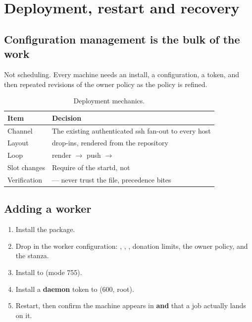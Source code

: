 \chapter{Deployment, restart and recovery}
\label{ch:deploy}

\section{Configuration management is the bulk of the work}

Not scheduling. Every machine needs an install, a configuration, a token, and
then repeated revisions of the owner policy as the policy is refined.

\begin{table}[H]
\centering
\begin{tabularx}{\textwidth}{L{0.20\textwidth} Y}
\toprule
\textbf{Item} & \textbf{Decision} \\
\midrule
Channel & The existing authenticated ssh fan-out to every host \\
Layout &  drop-ins, rendered from the repository \\
Loop & render $\rightarrow$ push $\rightarrow$  \\
Slot changes & Require  of the startd, not  \\
Verification &  --- never trust the file,  precedence bites \\
\bottomrule
\end{tabularx}
\caption{Deployment mechanics.}
\end{table}

\section{Adding a worker}

\begin{enumerate}
  \item Install the package.
  \item Drop in the worker configuration: ,
        , , donation limits, the owner
        policy, and the  stanza.
  \item Install  to  (mode 755).
  \item Install a \textbf{daemon} token to  (600, root).
  \item Restart, then confirm the machine appears in 
        \textbf{and} that a job actually lands on it.
\end{enumerate}

